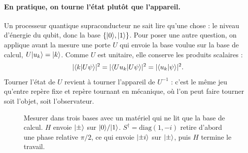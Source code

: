 \paragraph{En pratique, on tourne l'état plutôt que l'appareil.} Un processeur quantique supraconducteur ne sait lire qu'une chose : le niveau d'énergie du qubit, donc la base $\{\lvert 0\rangle,\lvert 1\rangle\}$. Pour poser une autre question, on applique avant la mesure une porte $U$ qui envoie la base voulue sur la base de calcul, $U\lvert u_k\rangle=\lvert k\rangle$. Comme $U$ est unitaire, elle conserve les produits scalaires :
\[
|\langle k\vert U\psi\rangle|^2=|\langle U u_k\vert U\psi\rangle|^2=|\langle u_k\vert \psi\rangle|^2 .
\]
Tourner l'état de $U$ revient à tourner l'appareil de $U^{-1}$ : c'est le même jeu qu'entre repère fixe et repère tournant en mécanique, où l'on peut faire tourner soit l'objet, soit l'observateur.

\begin{figure}[htbp]
\centering
{}
\caption{Mesurer dans trois bases avec un matériel qui ne lit que la base de calcul. $H$ envoie $\lvert \pm\rangle$ sur $\lvert 0\rangle/\lvert 1\rangle$. $S^\dagger=\mathrm{diag}(1,-i)$ retire d'abord une phase relative $\pi/2$, ce qui envoie $\lvert \pm i\rangle$ sur $\lvert \pm\rangle$, puis $H$ termine le travail.}\label{fig:mesure-bases}
\end{figure}

